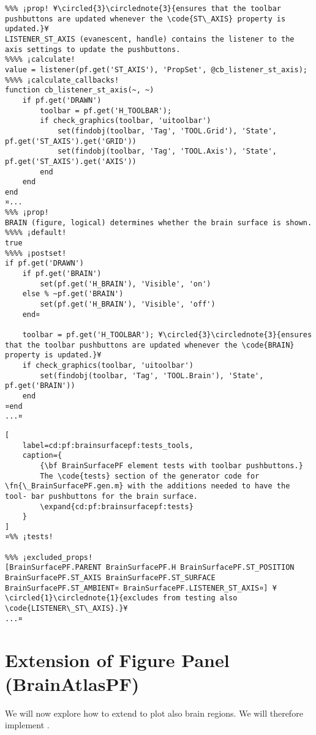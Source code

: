 \documentclass{tufte-handout}
\begin{document}
\begin{lstlisting}
%%% ¡prop! ¥\circled{3}\circlednote{3}{ensures that the toolbar pushbuttons are updated whenever the \code{ST\_AXIS} property is updated.}¥
LISTENER_ST_AXIS (evanescent, handle) contains the listener to the axis settings to update the pushbuttons.
%%%% ¡calculate!
value = listener(pf.get('ST_AXIS'), 'PropSet', @cb_listener_st_axis); 
%%%% ¡calculate_callbacks!
function cb_listener_st_axis(~, ~)
    if pf.get('DRAWN')
        toolbar = pf.get('H_TOOLBAR');
        if check_graphics(toolbar, 'uitoolbar')
            set(findobj(toolbar, 'Tag', 'TOOL.Grid'), 'State', pf.get('ST_AXIS').get('GRID'))
            set(findobj(toolbar, 'Tag', 'TOOL.Axis'), 'State', pf.get('ST_AXIS').get('AXIS'))
        end
    end
end
¤...
%%% ¡prop!
BRAIN (figure, logical) determines whether the brain surface is shown.
%%%% ¡default!
true
%%%% ¡postset!
if pf.get('DRAWN')
    if pf.get('BRAIN')
        set(pf.get('H_BRAIN'), 'Visible', 'on')
    else % ~pf.get('BRAIN') 
        set(pf.get('H_BRAIN'), 'Visible', 'off')
    end¤

    toolbar = pf.get('H_TOOLBAR'); ¥\circled{3}\circlednote{3}{ensures that the toolbar pushbuttons are updated whenever the \code{BRAIN} property is updated.}¥
    if check_graphics(toolbar, 'uitoolbar')
        set(findobj(toolbar, 'Tag', 'TOOL.Brain'), 'State', pf.get('BRAIN'))
    end
¤end
...¤
\end{lstlisting}

\begin{lstlisting}[
	label=cd:pf:brainsurfacepf:tests_tools,
	caption={
		{\bf BrainSurfacePF element tests with toolbar pushbuttons.}
		The \code{tests} section of the generator code for \fn{\_BrainSurfacePF.gen.m} with the additions needed to have the tool- bar pushbuttons for the brain surface.
		\expand{cd:pf:brainsurfacepf:tests}
	}
]
¤%% ¡tests!

%%% ¡excluded_props! 
[BrainSurfacePF.PARENT BrainSurfacePF.H BrainSurfacePF.ST_POSITION BrainSurfacePF.ST_AXIS BrainSurfacePF.ST_SURFACE BrainSurfacePF.ST_AMBIENT¤ BrainSurfacePF.LISTENER_ST_AXIS¤] ¥\circled{1}\circlednote{1}{excludes from testing also \code{LISTENER\_ST\_AXIS}.}¥
...¤
\end{lstlisting}

\clearpage
\section{Extension of Figure Panel (BrainAtlasPF)}

We will now explore how to extend  to plot also brain regions. We will therefore implement .
\end{document}
